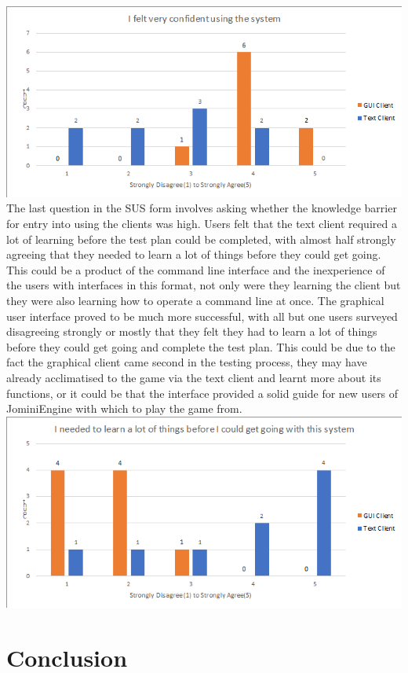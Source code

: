 \documentclass{article}
\begin{document}
\\
\includegraphics[width=\textwidth]{graph9.PNG}
The last question in the SUS form involves asking whether the knowledge barrier for entry into using the clients was high. Users felt that the text client required a lot of learning before the test plan could be completed, with almost half strongly agreeing that they needed to learn a lot of things before they could get going. This could be a product of the command line interface and the inexperience of the users with interfaces in this format, not only were they learning the client but they were also learning how to operate a command line at once. The graphical user interface proved to be much more successful, with all but one users surveyed disagreeing strongly or mostly that they felt they had to learn a lot of things before they could get going and complete the test plan. This could be due to the fact the graphical client came second in the testing process, they may have already acclimatised to the game via the text client and learnt more about its functions, or it could be that the interface provided a solid guide for new users of JominiEngine with which to play the game from.
\\
\includegraphics[width=\textwidth]{graph10.PNG}
\newpage
\section{Conclusion}
\end{document}
